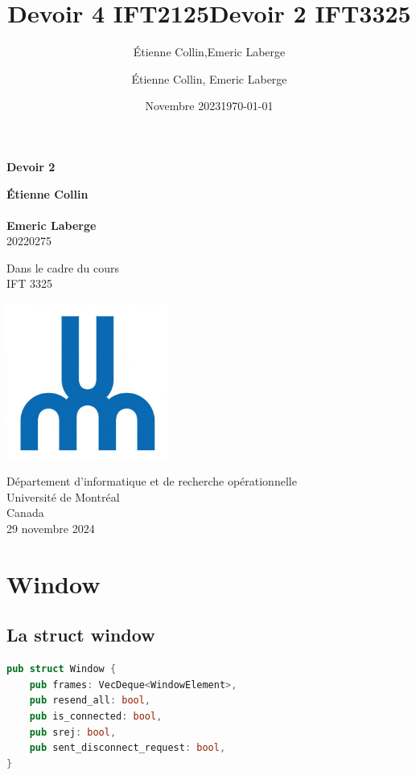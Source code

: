 \documentclass[french]{article}
\title{Devoir 4 IFT2125}
\author{Étienne Collin,Emeric Laberge}
\date{Novembre 2023}
\begin{document}
 \title{Devoir 2 IFT3325}
\author{Étienne Collin, Emeric Laberge}
\date{\today}
\begin{titlepage}
	\begin{center}
		\vspace*{1cm}

		\Huge
		\textbf{Devoir 2}

		\vspace{0.5cm}
		\LARGE

		\vspace{1.5cm}


    \textbf{Étienne Collin}\\ \?\?\ \\

		\textbf{Emeric Laberge}\\ 20220275

		\vfill

		Dans le cadre du cours\\
    IFT 3325 


		\vspace{0.8cm}

		\includegraphics[width=0.4\textwidth]{udem.jpg}

		\Large
		Département d'informatique et de recherche opérationnelle\\
		Université de Montréal\\
		Canada\\
		29 novembre 2024

	\end{center}
\end{titlepage}


\section{Window}
\subsection{La struct window} 
\begin{lstlisting}[language=Rust] 
pub struct Window {
    pub frames: VecDeque<WindowElement>,
    pub resend_all: bool,
    pub is_connected: bool,
    pub srej: bool,
    pub sent_disconnect_request: bool,
} 
\end{lstlisting} 
\end{document}
